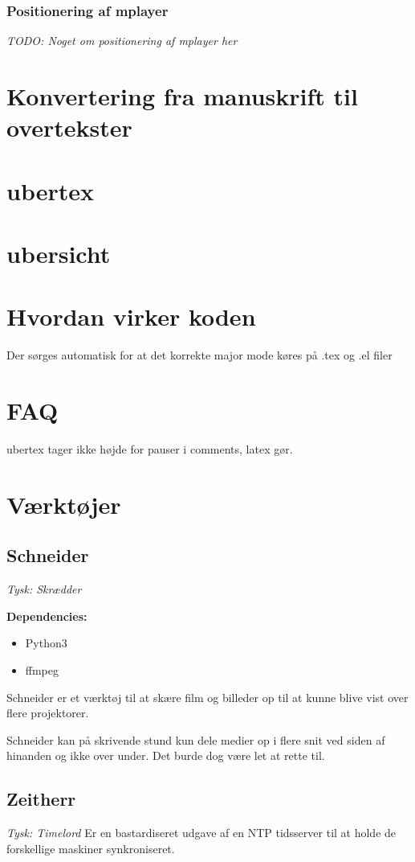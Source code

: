 \documentclass[10pt,a4paper,danish]{article}
\begin{document}
\subsubsection{Positionering af mplayer}
\textit{TODO: Noget om positionering af mplayer her}

\section{Konvertering fra manuskrift til overtekster}
\section{ubertex}
\section{ubersicht}
\section{Hvordan virker koden}

Der sørges automatisk for at det korrekte major mode køres på .tex og .el filer
\section{FAQ}
ubertex tager ikke højde for pauser i comments, latex gør.

\section{Værktøjer}
\subsection{Schneider}
\textit{Tysk: Skrædder}

\textbf{Dependencies:}
\begin{itemize}
\item Python3
\item ffmpeg
\end{itemize}

Schneider er et værktøj til at skære film og billeder op til at kunne blive vist over flere
projektorer.

Schneider kan på skrivende stund kun dele medier op i flere snit ved siden af
hinanden og ikke over under. Det burde dog være let at rette til.

\subsection{Zeitherr}
\textit{Tysk: Timelord}
Er en bastardiseret udgave af en NTP tidsserver til at holde de forskellige
maskiner synkroniseret.
\end{document}
